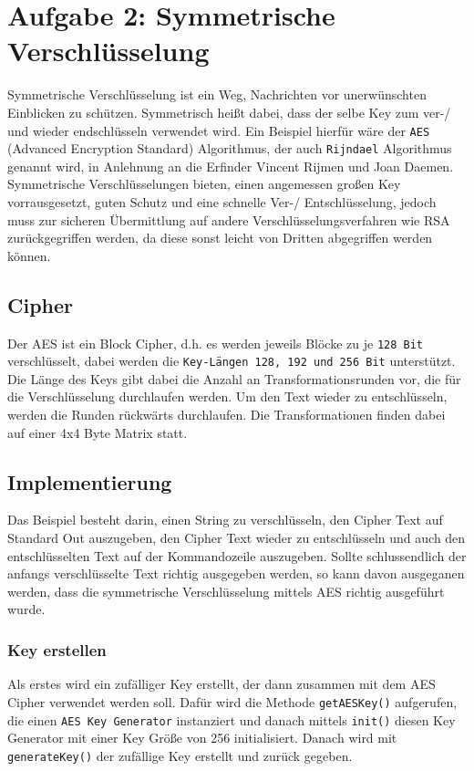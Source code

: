 \documentclass[12pt]{article}
\begin{document}
\section{Aufgabe 2: Symmetrische Verschlüsselung}
Symmetrische Verschlüsselung ist ein Weg, Nachrichten vor unerwünschten
Einblicken zu schützen. Symmetrisch heißt dabei, dass der selbe Key zum ver-/
und wieder endschlüsseln verwendet wird. Ein Beispiel hierfür wäre der \texttt{AES}
(Advanced Encryption Standard) Algorithmus, der auch \texttt{Rijndael}
Algorithmus genannt wird, in Anlehnung an die Erfinder Vincent Rijmen und Joan
Daemen. Symmetrische Verschlüsselungen bieten, einen angemessen großen Key
vorrausgesetzt, guten Schutz und eine schnelle Ver-/ Entschlüsselung, 
jedoch muss zur sicheren Übermittlung auf andere
Verschlüsselungsverfahren wie RSA zurückgegriffen werden, da diese sonst leicht
von Dritten abgegriffen werden können.

\subsection{Cipher}
Der AES ist ein Block Cipher, d.h. es werden jeweils Blöcke zu je \texttt{128 Bit}
verschlüsselt, dabei werden die \texttt{Key-Längen 128, 192 und 256 Bit}
unterstützt. Die Länge des Keys gibt dabei die Anzahl an Transformationsrunden
vor, die für die Verschlüsselung durchlaufen werden. Um den Text wieder zu
entschlüsseln, werden die Runden rückwärts durchlaufen. Die Transformationen
finden dabei auf einer 4x4 Byte Matrix statt.

\subsection{Implementierung}
Das Beispiel besteht darin, einen String zu verschlüsseln, den Cipher Text auf
Standard Out auszugeben, den Cipher Text wieder zu entschlüsseln und auch den
entschlüsselten Text auf der Kommandozeile auszugeben. Sollte schlussendlich der
anfangs verschlüsselte Text richtig ausgegeben werden, so kann davon ausgeganen werden,
dass die symmetrische Verschlüsselung mittels AES richtig ausgeführt wurde.

\subsubsection{Key erstellen}
Als erstes wird ein zufälliger Key erstellt, der dann zusammen mit dem AES
Cipher verwendet werden soll. Dafür wird die Methode \texttt{getAESKey()}
aufgerufen, die einen \texttt{AES Key Generator} instanziert und danach mittels
\texttt{init()} diesen Key Generator mit einer Key Größe von 256 initialisiert.
Danach wird mit \texttt{generateKey()} der zufällige Key erstellt und zurück
gegeben.
\end{document}
